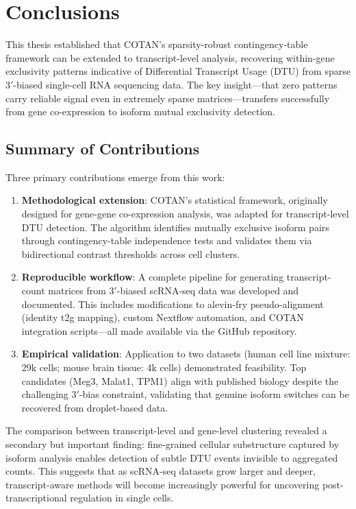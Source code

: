 \chapter{Conclusions}

This thesis established that COTAN's sparsity-robust contingency-table framework can be extended to transcript-level analysis, recovering within-gene exclusivity patterns indicative of Differential Transcript Usage (DTU) from sparse $3'$-biased single-cell RNA sequencing data. The key insight---that zero patterns carry reliable signal even in extremely sparse matrices---transfers successfully from gene co-expression to isoform mutual exclusivity detection.

\section{Summary of Contributions}

Three primary contributions emerge from this work:
\begin{enumerate}
    \item \textbf{Methodological extension}: COTAN's statistical framework, originally designed for gene-gene co-expression analysis, was adapted for transcript-level DTU detection. The algorithm identifies mutually exclusive isoform pairs through contingency-table independence tests and validates them via bidirectional contrast thresholds across cell clusters.

    \item \textbf{Reproducible workflow}: A complete pipeline for generating transcript-count matrices from $3'$-biased scRNA-seq data was developed and documented. This includes modifications to alevin-fry pseudo-alignment (identity t2g mapping), custom Nextflow automation, and COTAN integration scripts---all made available via the GitHub repository.

    \item \textbf{Empirical validation}: Application to two datasets (human cell line mixture: 29k cells; mouse brain tissue: 4k cells) demonstrated feasibility. Top candidates (Meg3, Malat1, TPM1) align with published biology \cite{ghanam2023malat1, xue2012specialized} despite the challenging $3'$-bias constraint, validating that genuine isoform switches can be recovered from droplet-based data.
\end{enumerate}

The comparison between transcript-level and gene-level clustering revealed a secondary but important finding: fine-grained cellular substructure captured by isoform analysis enables detection of subtle DTU events invisible to aggregated counts. This suggests that as scRNA-seq datasets grow larger and deeper, transcript-aware methods will become increasingly powerful for uncovering post-transcriptional regulation in single cells.

